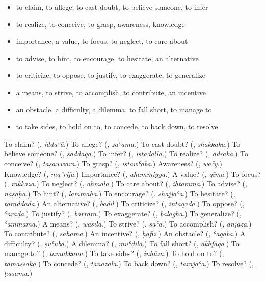 \begin{itemize}
\raggedright
  \item to claim, to allege, to cast doubt, to believe someone, to infer
  \item to realize, to conceive, to grasp, awareness, knowledge
  \item importance, a value, to focus, to neglect, to care about
  \item to advise, to hint, to encourage, to hesitate, an alternative
  \item to criticize, to oppose, to justify, to exaggerate, to generalize
  \item a means, to strive, to accomplish, to contribute, an incentive
  \item an obstacle, a difficulty, a dilemma, to fall short, to manage to
  \item to take sides, to hold on to, to concede, to back down, to resolve
\end{itemize}

\begin{tcolorbox}[breakable,colback=teal!4,colframe=teal!35!black,title={Before you move on}]
To claim? (\textbf{}, \emph{iddaʿā}.) To allege? (\textbf{}, \emph{zaʿama}.) To cast doubt? (\textbf{}, \emph{shakkaka}.) To believe someone? (\textbf{}, \emph{ṣaddaqa}.) To infer? (\textbf{}, \emph{istadalla}.) To realize? (\textbf{}, \emph{adraka}.) To conceive? (\textbf{}, \emph{taṣawwara}.) To grasp? (\textbf{}, \emph{istawʿaba}.) Awareness? (\textbf{}, \emph{waʿy}.) Knowledge? (\textbf{}, \emph{maʿrifa}.) Importance? (\textbf{}, \emph{ahammiyya}.) A value? (\textbf{}, \emph{qīma}.) To focus? (\textbf{}, \emph{rakkaza}.) To neglect? (\textbf{}, \emph{ahmala}.) To care about? (\textbf{}, \emph{ihtamma}.) To advise? (\textbf{}, \emph{naṣaḥa}.) To hint? (\textbf{}, \emph{lammaḥa}.) To encourage? (\textbf{}, \emph{shajjaʿa}.) To hesitate? (\textbf{}, \emph{taraddada}.) An alternative? (\textbf{}, \emph{badīl}.) To criticize? (\textbf{}, \emph{intaqada}.) To oppose? (\textbf{}, \emph{ʿāraḍa}.) To justify? (\textbf{}, \emph{barrara}.) To exaggerate? (\textbf{}, \emph{bālagha}.) To generalize? (\textbf{}, \emph{ʿammama}.) A means? (\textbf{}, \emph{wasīla}.) To strive? (\textbf{}, \emph{saʿā}.) To accomplish? (\textbf{}, \emph{anjaza}.) To contribute? (\textbf{}, \emph{sāhama}.) An incentive? (\textbf{}, \emph{ḥāfiz}.) An obstacle? (\textbf{}, \emph{ʿaqaba}.) A difficulty? (\textbf{}, \emph{ṣuʿūba}.) A dilemma? (\textbf{}, \emph{muʿḍila}.) To fall short? (\textbf{}, \emph{akhfaqa}.) To manage to? (\textbf{}, \emph{tamakkana}.) To take sides? (\textbf{}, \emph{inḥāza}.) To hold on to? (\textbf{}, \emph{tamassaka}.) To concede? (\textbf{}, \emph{tanāzala}.) To back down? (\textbf{}, \emph{tarājaʿa}.) To resolve? (\textbf{}, \emph{ḥasama}.)
\end{tcolorbox}
